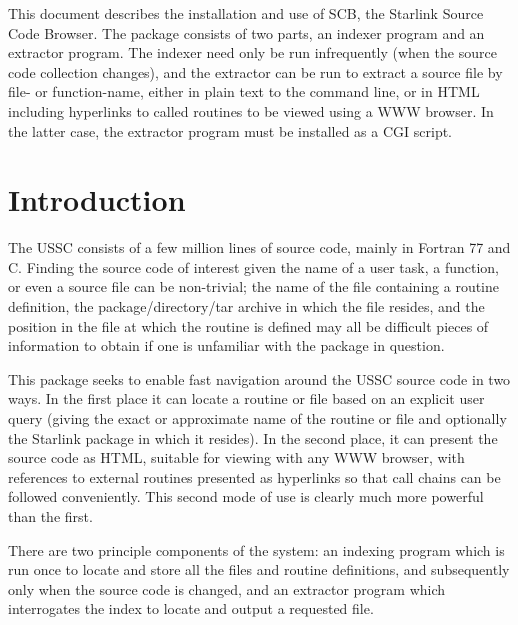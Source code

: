 \documentclass[twoside,11pt]{article}
\newcommand{\stardocinitials}  {SUN}
\newcommand{\stardocnumber}    {226.1}
\newcommand{\stardocabstract}  {
This document describes the installation and use of SCB, 
the Starlink Source Code Browser.  
The package consists of two parts, an indexer program and an
extractor program.
The indexer need only be run infrequently (when the source code collection
changes), and the extractor can be run to extract a source file
by file- or function-name, either in plain text to the command line,
or in HTML including hyperlinks to called routines to be viewed
using a WWW browser.  In the latter case, the extractor program 
must be installed as a CGI script.
}
\newcommand{\stardocname}{\stardocinitials /\stardocnumber}
\newenvironment{latexonly}{}{}
\renewcommand{\_}{\texttt{\symbol{95}}}
\renewcommand{\thepage}{\roman{page}}
\begin{document}
\stardocabstract
  \newpage
  \begin{latexonly}
    \setlength{\parskip}{0mm}
    \tableofcontents
    \setlength{\parskip}{\medskipamount}
    \markboth{\stardocname}{\stardocname}
  \end{latexonly}
\cleardoublepage
\renewcommand{\thepage}{\arabic{page}}
\setcounter{page}{1}


\section{Introduction}

The USSC consists of a few million lines of source code, mainly in 
Fortran 77 and C. 
Finding the source code of interest given the name of a
user task, a function, or even a source file can be non-trivial;
the name of the file containing a routine definition,
the package/directory/tar archive in which the file resides,
and the position in the file at which the routine is defined
may all be difficult pieces of information to obtain if one is
unfamiliar with the package in question.

This package seeks to enable fast navigation around the USSC 
source code in two ways.  In the first place it can locate a routine
or file based on an explicit user query (giving the exact or
approximate name of the routine or file and optionally the Starlink 
package in which it resides).  In the second place, it can present
the source code as HTML, suitable for viewing with any WWW browser,
with references to external routines presented as hyperlinks so
that call chains can be followed conveniently.
This second mode of use is clearly much more powerful than the first.

There are two principle components of the system: an indexing program
which is run once to locate and store all the files and routine 
definitions, and subsequently only when the source code is changed,
and an extractor program which interrogates the index to locate 
and output a requested file.
\end{document}
